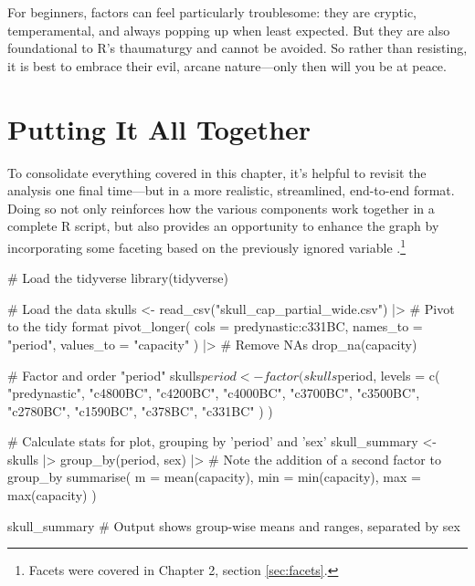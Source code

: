 For beginners, factors can feel particularly troublesome: they are cryptic, temperamental, and always popping up when least expected. But they are also foundational to R's thaumaturgy and cannot be avoided. So rather than resisting, it is best to embrace their evil, arcane \mbox{nature}—only then will you be at peace.

\clearpage

\section{Putting It All Together}

To consolidate everything covered in this chapter, it's helpful to revisit the analysis one final time—but in a more realistic, streamlined, end-to-end format. Doing so not only reinforces how the various components work together in a complete R script, but also provides an opportunity to enhance the graph by incorporating some faceting based on the previously ignored variable .\footnote{Facets were covered in Chapter 2, section \ref{sec:facets}.}

\begin{inR}
# Load the tidyverse
library(tidyverse)
\end{inR}

\begin{inR}
# Load the data
skulls <- read_csv("skull_cap_partial_wide.csv") |>
  # Pivot to the tidy format
  pivot_longer(
    cols = predynastic:c331BC,
    names_to = "period",
    values_to = "capacity"
  ) |>
  # Remove NAs
  drop_na(capacity)
\end{inR}

\begin{inR}
# Factor and order "period"
skulls$period <- factor(skulls$period,
  levels = c(
    "predynastic", "c4800BC", "c4200BC", "c4000BC", "c3700BC",
    "c3500BC",     "c2780BC", "c1590BC", "c378BC",  "c331BC"
  )
)
\end{inR}


\begin{inR}
# Calculate stats for plot, grouping by 'period' and 'sex'
skull_summary <- skulls |>
  group_by(period, sex) |> # Note the addition of a second factor to group_by
  summarise(
    m = mean(capacity),
    min = min(capacity),
    max = max(capacity)
  )

skull_summary # Output shows group-wise means and ranges, separated by sex
\end{inR}

